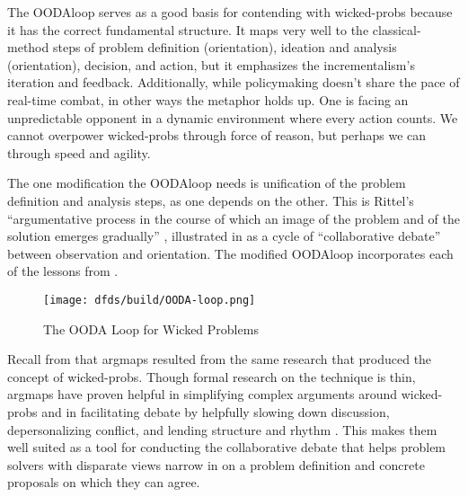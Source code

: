 The \ac{OODAloop} serves as a good basis for contending with \acp{wicked-prob} because it has the correct fundamental
structure. It maps very well to the \ac{classical-method} steps of problem definition (orientation), ideation and
analysis (orientation), decision, and action, but it emphasizes the \ac{incrementalism}'s iteration and feedback.
Additionally, while policymaking doesn't share the pace of real-time combat, in other ways the metaphor holds up. One is
facing an unpredictable opponent in a dynamic environment where every action counts. We cannot overpower
\acp{wicked-prob} through force of reason, but perhaps we can through speed and agility.

The one modification the \ac{OODAloop} needs is unification of the problem definition and analysis steps, as one depends
on the other. This is Rittel's ``argumentative process in the course of which an image of the problem and of the
solution emerges gradually'' \cite{rittel_dilemmas_1973}, illustrated in  as a cycle of
``collaborative debate'' between observation and orientation. The modified \ac{OODAloop} incorporates each of the
lessons from .

\begin{figure}[h]
    \centering\CaptionFontSize
    \texttt{[image: dfds/build/OODA-loop.png]}
    \caption{The OODA Loop for Wicked Problems}
    \label{fig-policy-ooda-loop}
\end{figure}

Recall from  that \acp{argmap} resulted from the same research that produced the concept of
\acp{wicked-prob}. Though formal research on the technique is thin, \acp{argmap} have proven helpful in simplifying
complex arguments around \acp{wicked-prob} \cite{renton_2007} and in facilitating debate by helpfully slowing down
discussion, depersonalizing conflict, and lending structure and rhythm \cite{dutoit_hypermedia_2006}. This makes them
well suited as a tool for conducting the collaborative debate that helps problem solvers with disparate views narrow in
on a problem definition and concrete proposals on which they can agree.



